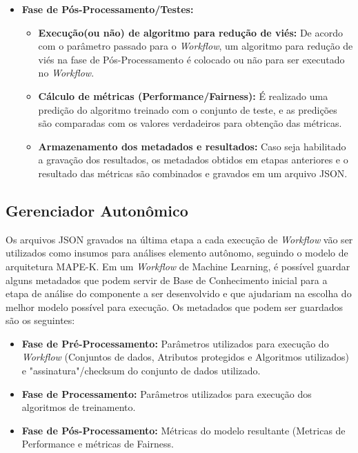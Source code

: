 \documentclass[portugues]{ic-tese}
\begin{document}
\begin{itemize}
\begin{itemize}
	\end{itemize}
\item \textbf{Fase de Pós-Processamento/Testes:}
	\begin{itemize}
	\item \textbf{Execução(ou não) de algoritmo para redução de viés:} De acordo com o parâmetro passado para o \textit{Workflow}, um algoritmo para redução de viés na fase de Pós-Processamento é colocado ou não para ser executado no \textit{Workflow}.
	\item \textbf{Cálculo de métricas (Performance/Fairness):} É realizado uma predição do algoritmo treinado com o conjunto de teste, e as predições são comparadas com os valores verdadeiros para obtenção das métricas.
	\item \textbf{Armazenamento dos metadados e resultados:} Caso seja habilitado a gravação dos resultados, os metadados obtidos em etapas anteriores e o resultado das métricas são combinados e gravados em um arquivo JSON.
	\end{itemize}
\end{itemize}

\subsection{Gerenciador Autonômico}

Os arquivos JSON gravados na última etapa a cada execução de \textit{Workflow} vão ser utilizados como insumos para análises elemento autônomo, seguindo o modelo de arquitetura MAPE-K. Em um \textit{Workflow} de Machine Learning, é possível guardar alguns metadados que podem servir de Base de Conhecimento inicial para a etapa de análise do componente a ser desenvolvido e que ajudariam na escolha do melhor modelo possível para execução. Os metadados que podem ser guardados são os seguintes:

\begin{itemize}
\item \textbf{Fase de Pré-Processamento:} Parâmetros utilizados para execução do \textit{Workflow} (Conjuntos de dados, Atributos protegidos e Algoritmos utilizados) e "assinatura"/checksum do conjunto de dados utilizado.
\item \textbf{Fase de Processamento:} Parâmetros utilizados para execução dos algoritmos de treinamento.
\item \textbf{Fase de Pós-Processamento:} Métricas do modelo resultante (Metricas de Performance e métricas de Fairness.
\end{itemize}
\end{document}
